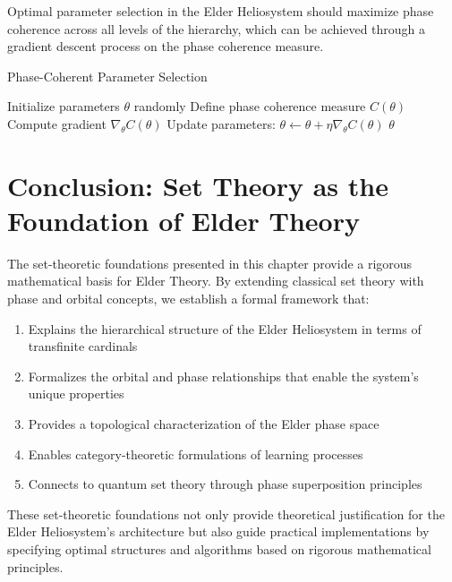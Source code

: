 \begin{theorem}
\begin{definition}
\begin{definition}
\begin{enumerate}
\begin{proposition}
Optimal parameter selection in the Elder Heliosystem should maximize phase coherence across all levels of the hierarchy, which can be achieved through a gradient descent process on the phase coherence measure.
\end{proposition}

\begin{algorithm}[h]
\caption{Phase-Coherent Parameter Selection}
\begin{algorithmic}[1]
\State Initialize parameters $\theta$ randomly
\State Define phase coherence measure $C(\theta)$
\State Compute gradient $\nabla_{\theta} C(\theta)$
\State Update parameters: $\theta \leftarrow \theta + \eta \nabla_{\theta} C(\theta)$
\EndWhile
\State \Return $\theta$
\end{algorithmic}
\end{algorithm}

\section{Conclusion: Set Theory as the Foundation of Elder Theory}

The set-theoretic foundations presented in this chapter provide a rigorous mathematical basis for Elder Theory. By extending classical set theory with phase and orbital concepts, we establish a formal framework that:

\begin{enumerate}
    \item Explains the hierarchical structure of the Elder Heliosystem in terms of transfinite cardinals
    \item Formalizes the orbital and phase relationships that enable the system's unique properties
    \item Provides a topological characterization of the Elder phase space
    \item Enables category-theoretic formulations of learning processes
    \item Connects to quantum set theory through phase superposition principles
\end{enumerate}

These set-theoretic foundations not only provide theoretical justification for the Elder Heliosystem's architecture but also guide practical implementations by specifying optimal structures and algorithms based on rigorous mathematical principles.


\end{enumerate}
\end{definition}
\end{definition}
\end{theorem}
